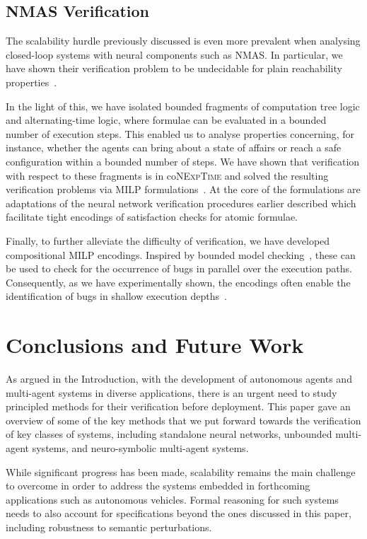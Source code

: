 \documentclass{article}
\newcommand{\conexptime}{co\nexptime}
\newcommand{\nexptime}{\textsc{NExpTime}\xspace}
\begin{document}
\subsection{NMAS Verification} The scalability hurdle previously discussed is
even more prevalent when analysing closed-loop systems with neural components
such as NMAS.  In particular, we have shown their verification problem to be
undecidable for plain reachability properties~\cite{Akintunde+22}. 

In the light of this, we have isolated bounded fragments of computation tree
logic and alternating-time logic, where formulae can be evaluated in a bounded
number of execution steps. This enabled us to analyse properties concerning,
for instance, whether the agents can bring about a state of affairs or reach a
safe configuration within a bounded number of steps. We have shown that
verification with respect to these fragments is in \conexptime and solved the
resulting verification problems via MILP
formulations~\cite{Akintunde+20,Akintunde+20b}. At the core of the formulations
are adaptations of the neural network verification procedures earlier described
which facilitate tight encodings of satisfaction checks for atomic formulae. 

Finally, to further alleviate the difficulty of verification, we have
developed compositional MILP encodings. Inspired by bounded model
checking~\cite{Clarke+01a}, these can be used to check for the occurrence of
bugs in parallel over the execution paths. Consequently, as we have
experimentally shown, the encodings often enable the identification of bugs in
shallow execution depths~\cite{Akintunde+20}.

\section{Conclusions and Future Work}

As argued in the Introduction, with the development of autonomous agents and
multi-agent systems in diverse applications, there is an urgent need to study
principled methods for their verification before deployment. This paper gave an
overview of some of the key methods that we put forward towards the verification
of key classes of systems, including standalone neural networks, unbounded multi-agent systems, 
and  neuro-symbolic multi-agent systems. 

While significant progress has been made,  scalability remains the main
challenge to overcome in order to address the  systems embedded
in forthcoming applications such as autonomous vehicles. Formal reasoning for
such systems needs to also  account for specifications beyond the ones
discussed in this paper, including robustness to semantic perturbations.
\end{document}
